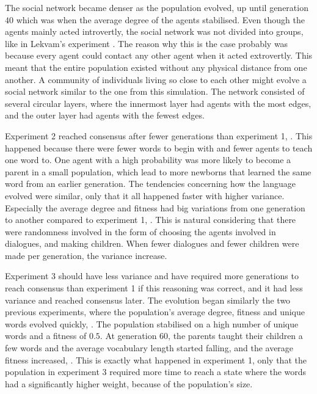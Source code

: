 The social network became denser as the population evolved, up until generation $40$ which was when the average degree of the agents stabilised. Even though the agents mainly acted introvertly, the social network was not divided into groups, like in Lekvam’s experiment \citep[Section 5.1]{lekvam2014co}. The reason why this is the case probably was because every agent could contact any other agent when it acted extrovertly. This meant that the entire population existed without any physical distance from one another. A community of individuals living so close to each other might evolve a social network similar to the one from this simulation. The network consisted of several circular layers, where the innermost layer had agents with the most edges, and the outer layer had agents with the fewest edges.

Experiment 2 reached consensus after fewer generations than experiment 1, . This happened because there were fewer words to begin with and fewer agents to teach one word to. One agent with a high probability was more likely to become a parent in a small population, which lead to more newborns that learned the same word from an earlier generation. The tendencies concerning how the language evolved were similar, only that it all happened faster with higher variance. Especially the average degree and fitness had big variations from one generation to another compared to experiment 1, . This is natural considering that there were randomness involved in the form of choosing the agents involved in dialogues, and making children. When fewer dialogues and fewer children were made per generation, the variance increase.

Experiment 3 should have less variance and have required more generations to reach consensus than experiment 1 if this reasoning was correct, and it had less variance and reached consensus later. The evolution began similarly the two previous experiments, where the population's average degree, fitness and unique words evolved quickly, . The population stabilised on a high number of unique words and a fitness of $0.5$. At generation $60$, the parents taught their children a few words and the average vocabulary length started falling, and the average fitness increased, . This is exactly what happened in experiment 1, only that the population in experiment 3 required more time to reach a state where the words had a significantly higher weight, because of the population’s size. 

